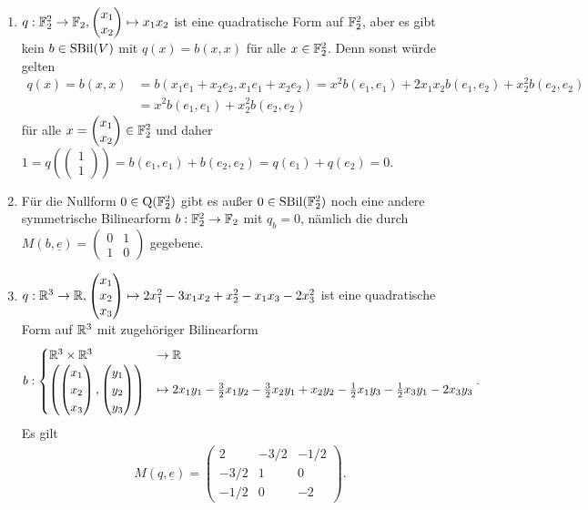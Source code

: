 \documentclass[../../main.tex]{subfiles}
\begin{document}
\begin{bsp}
	$\;$
	\begin{enumerate}[\normalfont(a)]
		\item $q: \mathbb F_2^2\to \mathbb F_2, \begin{pmatrix}x_1\\x_2\end{pmatrix}\mapsto x_1x_2$ ist eine quadratische Form auf $\mathbb F_2^2$, aber es gibt kein $b\in \operatorname{SBil}(V)$ mit $q(x)=b(x,x)$ für alle $x\in \mathbb F_2^2$. Denn sonst würde gelten
		\begin{align*}	
			q(x)=b(x,x)&=b(x_1e_1+x_2e_2,x_1e_1+x_2e_2)=x^2b(e_1,e_1)+2x_1x_2b(e_1,e_2)+x_2^2b(e_2,e_2)\\
			&=x^2b(e_1,e_1)+x_2^2b(e_2,e_2)
		\end{align*}
		für alle $x=\begin{pmatrix}x_1\\x_2\end{pmatrix}\in \mathbb F_2^2$ und daher $1=q\left(\begin{pmatrix}1\\1\end{pmatrix}\right)=b(e_1,e_1)+b(e_2,e_2)=q(e_1)+q(e_2)=0$.
		\item Für die Nullform  $0\in \operatorname{Q}(\mathbb F_2^2)$ gibt es außer $0\in \operatorname{SBil}(\mathbb F_2^2)$ noch eine andere symmetrische Bilinearform $b: \mathbb F_2^2\to \mathbb F_2$ mit $q_b=0$, nämlich die durch $M(b,\underline{e})=\begin{pmatrix}0 & 1\\ 1&0\end{pmatrix}$ gegebene.
		\item $q: \mathbb R^3\to \mathbb R, \begin{pmatrix}x_1\\ x_2\\x_3\end{pmatrix}\mapsto 2x_1^2-3x_1x_2+x_2^2-x_1x_3-2x_3^2$ ist eine quadratische Form auf $\mathbb R^3$ mit zugehöriger Bilinearform
		\begin{align*}
			b: \begin{cases}\mathbb R^3\times \mathbb R^3&\to \mathbb R\\ \left(\begin{pmatrix}x_1\\ x_2\\x_3\end{pmatrix}, \begin{pmatrix}y_1\\ y_2\\y_3\end{pmatrix}\right)&\mapsto 2x_1y_1-\frac{3}{2}x_1y_2-\frac{3}{2}x_2y_1+x_2y_2-\frac{1}{2}x_1y_3-\frac{1}{2}x_3y_1-2x_3y_3\end{cases}.
		\end{align*}
		Es gilt
		\begin{align*}
			M(q,\underline{e})=\begin{pmatrix*} 2 & -3/2 & -1/2\\-3/2 &1 & 0\\ -1/2 & 0 & -2\end{pmatrix*}.
		\end{align*}
	\end{enumerate}
\end{bsp}
\end{document}

